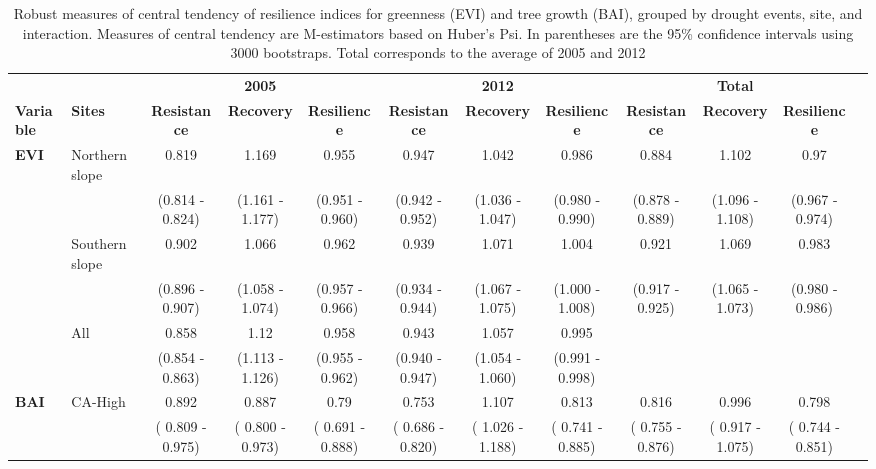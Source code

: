 \begin{table} 
\caption{Robust measures of central tendency of resilience indices for greenness (EVI) and tree growth (BAI), grouped by drought events, site, and interaction. Measures of central tendency are M-estimators based on Huber's Psi. In parentheses are the 95\% confidence intervals using 3000 bootstraps. Total corresponds to the average of 2005 and 2012}
\label{tab:dendro:huber}
\begin{adjustbox}{width=\linewidth}
\begin{threeparttable}
\begin{tabular}{@{}ll|ccc|ccc|cccl@{}}
 &  & \multicolumn{1}{l}{} & \textbf{2005} & \multicolumn{1}{l|}{} & \multicolumn{1}{l}{} & \textbf{2012} & \multicolumn{1}{l|}{} & \multicolumn{1}{l}{} & \textbf{Total} & \multicolumn{1}{l}{} &  \\ \cmidrule(r){1-11}
\textbf{Variable} & \textbf{Sites} & \textbf{Resistance} & \textbf{Recovery} & \textbf{Resilience} & \textbf{Resistance} & \textbf{Recovery} & \textbf{Resilience} & \textbf{Resistance} & \textbf{Recovery} & \textbf{Resilience} &  \\ \cmidrule(r){1-11}
\textbf{EVI} & Northern slope & 0.819 & 1.169 & 0.955 & 0.947 & 1.042 & 0.986 & 0.884 & 1.102 & 0.97 &  \\
 &  & (0.814 - 0.824) & (1.161 - 1.177) & (0.951 - 0.960) & (0.942 - 0.952) & (1.036 - 1.047) & (0.980 - 0.990) & (0.878 - 0.889) & (1.096 - 1.108) & (0.967 - 0.974) &  \\ \cmidrule(lr){2-11}
 & Southern slope & 0.902 & 1.066 & 0.962 & 0.939 & 1.071 & 1.004 & 0.921 & 1.069 & 0.983 &  \\
 &  & (0.896 - 0.907) & (1.058 - 1.074) & (0.957 - 0.966) & (0.934 - 0.944) & (1.067 - 1.075) & (1.000 - 1.008) & (0.917 - 0.925) & (1.065 - 1.073) & (0.980 - 0.986) &  \\ \cmidrule(lr){2-11}
 & All & 0.858 & 1.12 & 0.958 & 0.943 & 1.057 & 0.995 &  &  &  &  \\
 &  & (0.854 - 0.863) & (1.113 - 1.126) & (0.955 - 0.962) & (0.940 - 0.947) & (1.054 - 1.060) & (0.991 - 0.998) &  &  &  &  \\ \cmidrule(r){1-11}
\textbf{BAI} & CA-High & 0.892 & 0.887 & 0.79 & 0.753 & 1.107 & 0.813 & 0.816 & 0.996 & 0.798 &  \\
 &  & ( 0.809 - 0.975) & ( 0.800 - 0.973) & ( 0.691 - 0.888) & ( 0.686 - 0.820) & ( 1.026 - 1.188) & ( 0.741 - 0.885) & ( 0.755 - 0.876) & ( 0.917 - 1.075) & ( 0.744 - 0.851) &  \\ \cmidrule(lr){2-11}

\end{tabular}
\end{threeparttable}
\end{adjustbox}
\end{table}
